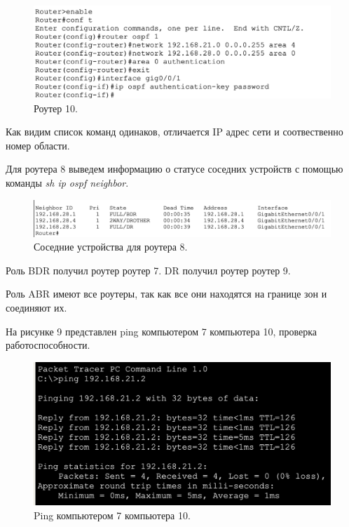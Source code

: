 \documentclass[a4paper,14pt]{extreport} %
\begin{document}
\begin{enumerate}
\begin{figure}[H]
  \centering
  \includegraphics[scale=0.8]{7}
  \caption{Роутер 10. }
\end{figure}

Как видим список команд одинаков, отличается IP адрес сети и соотвественно номер области.

Для роутера 8 выведем информацию о статусе соседних устройств с помощью команды \textit{sh ip ospf neighbor}.

\begin{figure}[H]
  \centering
  \includegraphics[scale=0.65]{8}
  \caption{Соседние устройства для роутера 8. }
\end{figure}

Роль BDR получил роутер роутер 7. DR получил роутер роутер 9.

Роль ABR имеют все роутеры, так как все они находятся на границе зон и соединяют их.

На рисунке 9 представлен ping компьютером 7 компьютера 10, проверка работоспособности.

\begin{figure}[H]
  \centering
  \includegraphics[scale=0.8]{9}
  \caption{Ping компьютером 7 компьютера 10. }
\end{figure}

\end{enumerate}
\end{document}
